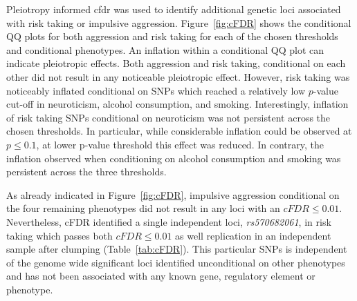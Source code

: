 Pleiotropy informed \acrfull{cfdr} was used to identify additional genetic loci associated with risk taking or impulsive aggression.
Figure~\ref{fig:cFDR} shows the conditional QQ plots for both aggression and risk taking for each of the chosen thresholds and conditional phenotypes.
An inflation within a conditional QQ plot can indicate pleiotropic effects.
Both aggression and risk taking, conditional on each other did not result in any noticeable pleiotropic effect.
However, risk taking was noticeably inflated conditional on SNPs which reached a relatively low $p$-value cut-off in neuroticism, alcohol consumption, and smoking.
Interestingly, inflation of risk taking SNPs conditional on neuroticism was not persistent across the chosen thresholds.
In particular, while considerable inflation could be observed at $p\leq0.1$, at lower p-value threshold this effect was reduced.
In contrary, the inflation observed when conditioning on alcohol consumption and smoking was persistent across the three thresholds.

As already indicated in Figure~\ref{fig:cFDR}, impulsive aggression conditional on the four remaining phenotypes did not result in any loci with an $cFDR\leq0.01$.
Nevertheless, cFDR identified a single independent loci, \textit{rs570682061}, in risk taking which passes both $cFDR\leq0.01$ as well replication in an independent sample after clumping (Table~\ref{tab:cFDR}).
This particular SNPs is independent of the genome wide significant loci identified unconditional on other phenotypes and has not been associated with any known gene, regulatory element or phenotype.

